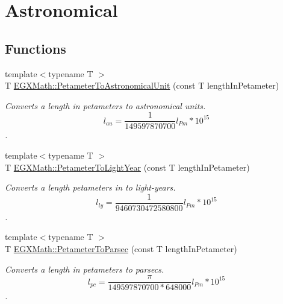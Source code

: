 \hypertarget{group___e_g_x_math-_conversions-_length_conversions-_s_i-_petameter-_astronomical}{}\section{Astronomical}
\label{group___e_g_x_math-_conversions-_length_conversions-_s_i-_petameter-_astronomical}
\subsection*{Functions}
\begin{DoxyCompactItemize}
\item 
{\footnotesize template$<$typename T $>$ }\\T \mbox{\hyperlink{group___e_g_x_math-_conversions-_length_conversions-_s_i-_petameter-_astronomical_ga8d28d4fb81bdbac19c416be69973fcf9}{E\+G\+X\+Math\+::\+Petameter\+To\+Astronomical\+Unit}} (const T length\+In\+Petameter)
\begin{DoxyCompactList}\small\item\em Converts a length in petameters to astronomical units. \[ l_{au}= \frac{1}{149597870700} l_{Pm} * 10^{15} \]. \end{DoxyCompactList}\item 
{\footnotesize template$<$typename T $>$ }\\T \mbox{\hyperlink{group___e_g_x_math-_conversions-_length_conversions-_s_i-_petameter-_astronomical_gaea87071d89d0f8dbb3b4df023587b82f}{E\+G\+X\+Math\+::\+Petameter\+To\+Light\+Year}} (const T length\+In\+Petameter)
\begin{DoxyCompactList}\small\item\em Converts a length petameters in to light-\/years. \[ l_{ly}= \frac{1}{9460730472580800} l_{Pm} * 10^{15} \]. \end{DoxyCompactList}\item 
{\footnotesize template$<$typename T $>$ }\\T \mbox{\hyperlink{group___e_g_x_math-_conversions-_length_conversions-_s_i-_petameter-_astronomical_ga6579583b24214c285978b0e08e163a9d}{E\+G\+X\+Math\+::\+Petameter\+To\+Parsec}} (const T length\+In\+Petameter)
\begin{DoxyCompactList}\small\item\em Converts a length in petameters to parsecs. \[ l_{pc}=\frac{\pi}{149597870700 * 648000} l_{Pm} * 10^{15} \]. \end{DoxyCompactList}\end{DoxyCompactItemize}



